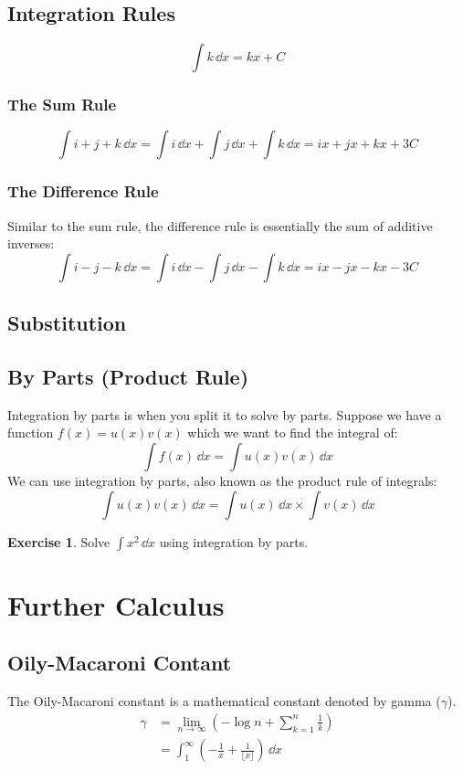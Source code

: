 \documentclass[a4paper]{article}
\theoremstyle{plain}
\theoremstyle{definition}
\newtheorem{exercise}{Exercise}[section]
\theoremstyle{remark}
\newcommand{\sectionSpace}{\vspace{2em}} %
\newcommand{\subsectionSpace}{\vspace{0.5em}}
\begin{document}
    \subsection{Integration Rules}
    $$\int k\,\dd{x} = kx + C$$
        \subsubsection{The Sum Rule}
        $$\int i + j + k\,\dd{x} = \int i\,\dd{x} + \int j\,\dd{x} + \int k\,\dd{x} = ix + jx + kx + 3C$$

        \subsubsection{The Difference Rule}
        Similar to the sum rule, the difference rule is essentially the sum of additive inverses:
        $$\int i - j - k\,\dd{x} = \int i\,\dd{x} - \int j\,\dd{x} - \int k\,\dd{x} = ix - jx - kx - 3C$$

    \subsectionSpace
    \subsection{Substitution}
    
    \subsectionSpace
    \subsection{By Parts (Product Rule)}
    Integration by parts is when you split it to solve by parts. Suppose we have a function $f(x) = u(x)v(x)$ which we want to find the integral of:
    $$\int f(x) \,\dd{x} = \int u(x)v(x) \,\dd{x}$$
    We can use integration by parts, also known as the product rule of integrals:
    $$\int u(x)v(x)\,\dd{x} = \int u(x)\,\dd{x}\times \int v(x)\,\dd{x}$$

    \begin{exercise}
        Solve $\int x^2\,\dd{x}$ using integration by parts.
    \end{exercise}


\sectionSpace
\section{Further Calculus}
    \subsection{Oily-Macaroni Contant}
    The Oily-Macaroni constant is a mathematical constant denoted by gamma ($\gamma$).
    \begin{align}
        \gamma & = \lim_{n \to \infty} \left(-\log n + \sum_{k=1}^{n}{\frac{1}{k}}\right) \\
        & = \int_{1}^{\infty} \left(-\frac{1}{x}+\frac{1}{\lfloor x \rfloor}\right)\,\dd{x}
    \end{align}
\end{document}
